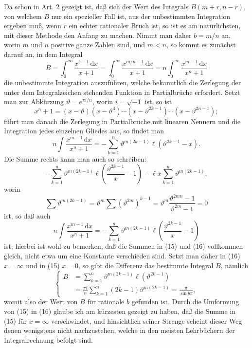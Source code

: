 \documentclass[11pt]{article}
\newcommand{\dd}{\,\mathrm d}
\begin{document}
Da schon in Art. 2 gezeigt ist, daß sich der Wert des Integrals $B(m+r,n-r)$, von welchem $B$ nur ein spezieller Fall ist, aus der unbestimmten Integration ergeben muß, wenn $r$ ein echter rationaler Bruch ist, so ist es am natürlichsten, mit dieser Methode den Anfang zu machen. Nimmt man daher $b=m/n$ an, worin $m$ und $n$ positive ganze Zahlen sind, und $m<n$, so kommt es zunächst darauf an, in dem Integral
\begin{equation}
B=\int_0^\infty \frac{x^{b-1}\dd x}{x+1}
=\int_0^\infty \frac{x^{m/n-1}\dd x}{x+1}
=n\int_0^\infty \frac{x^{m-1}\dd x}{x^n+1}
\tag{14}
\end{equation}
die unbestimmte Integration auszuführen, welche bekanntlich die Zerlegung der unter dem Integralzeichen stehenden Funktion in Partialbrüche erfordert. Setzt man zur Abkürzung $\vartheta=e^{\pi i/n}$, worin $i=\sqrt{-1}$ ist, so ist
\[
x^n+1=(x-\vartheta)(x-\vartheta^3)\cdots(x-\vartheta^{2k-1})\cdots(x-\vartheta^{2n-1});
\]
führt man danach die Zerlegung in Partialbrüche mit linearen Nennern und die Integration jedes einzelnen Gliedes aus, so findet man
\begin{equation}
n\int \frac{x^{m-1}\dd x}{x^n+1}
=-\sum_{k=1}^n \vartheta^{m(2k-1)}\ell(\vartheta^{2k-1}-x).
\tag{15}
\end{equation}
Die Summe rechts kann man auch so schreiben:
\[
-\sum_{k=1}^n \vartheta^{m(2k-1)}\ell\left(\frac{\vartheta^{2k-1}}{x}-1\right)
-\ell x\sum_{k=1}^n\vartheta^{m(2k-1)},
\]
worin
\[
\sum\vartheta^{m(2k-1)}=\vartheta^m\sum(\vartheta^{2m})^{k-1}
=\vartheta^m\frac{\vartheta^{2mn}-1}{\vartheta^{2m}-1}=0
\]
ist, so daß auch
\begin{equation}
n\int \frac{x^{m-1}\dd x}{x^n+1}
=-\sum_{k=1}^n\vartheta^{m(2k-1)}\ell\left(\frac{\vartheta^{2k-1}}{x}-1\right)
\tag{16}
\end{equation}
ist; hierbei ist wohl zu bemerken, daß die Summen in (15) und (16) vollkommen gleich, nicht etwa um eine Konstante verschieden sind. Setzt man daher in (16) $x=\infty$ und in (15) $x=0$, so gibt die Differenz das bestimmte Integral $B$, nämlich
\begin{equation}
\left\{
\begin{aligned}
B&=\sum_{k=1}^n\vartheta^{m(2k-1)}\ell(\vartheta^{2k-1})\\
&=\frac{\pi i}{n}\sum_{k=1}^n(2k-1)\vartheta^{m(2k-1)}=\frac{\pi}{\sin b\pi},
\end{aligned}
\right.
\tag{17}
\end{equation}
womit also der Wert von $B$ für rationale $b$ gefunden ist. Durch die Umformung von (15) in (16) glaube ich am kürzesten gezeigt zu haben, daß die Summe in (15) für $x=\infty$ verschwindet, und hinsichtlich seiner Strenge scheint dieser Weg denen wenigstens nicht nachzustehen, welche in den meisten Lehrbüchern der Integralrechnung befolgt sind.
\end{document}
